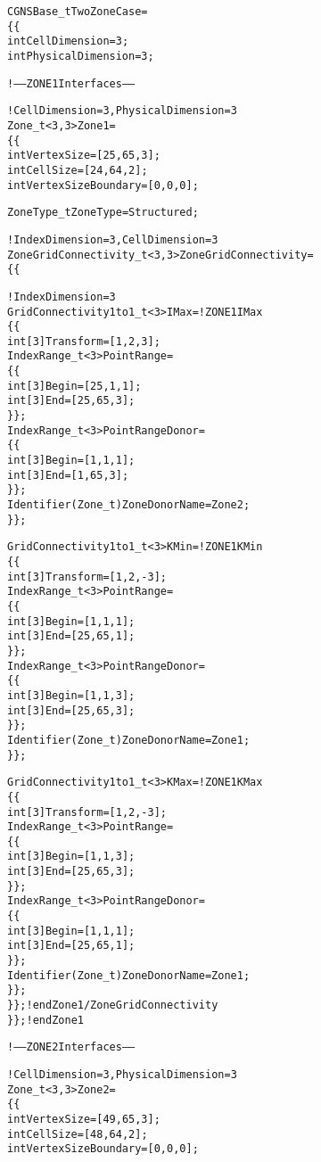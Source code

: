 \begin{alltt}
CGNSBase\_t TwoZoneCase =
  \{\{
  int CellDimension = 3 ;
  int PhysicalDimension = 3 ;


  !  -----  ZONE 1 Interfaces  ------

  !  CellDimension = 3, PhysicalDimension = 3
  Zone\_t<3,3> Zone1 =
    \{\{
    int VertexSize = [25,65,3] ;
    int CellSize   = [24,64,2] ;
    int VertexSizeBoundary = [0,0,0];

    ZoneType\_t ZoneType = Structured;

    !  IndexDimension = 3, CellDimension = 3
    ZoneGridConnectivity\_t<3,3> ZoneGridConnectivity =
      \{\{
 
      !  IndexDimension = 3
      GridConnectivity1to1\_t<3> IMax =                ! ZONE 1 IMax
        \{\{
        int[3] Transform = [1,2,3] ;
        IndexRange\_t<3> PointRange =
          \{\{
          int[3] Begin = [25,1 ,1] ;
          int[3] End   = [25,65,3] ;
          \}\} ;
        IndexRange\_t<3> PointRangeDonor =
          \{\{
          int[3] Begin = [1,1 ,1] ;
          int[3] End   = [1,65,3] ;
          \}\} ;
        Identifier(Zone\_t) ZoneDonorName = Zone2 ;
        \}\} ;

      GridConnectivity1to1\_t<3> KMin =                ! ZONE 1 KMin 
        \{\{
        int[3] Transform = [1,2,-3] ;
        IndexRange\_t<3> PointRange =
          \{\{
          int[3] Begin = [1 ,1 ,1] ;
          int[3] End   = [25,65,1] ;
          \}\} ;
        IndexRange\_t<3> PointRangeDonor =
          \{\{
          int[3] Begin = [1 ,1 ,3] ;
          int[3] End   = [25,65,3] ;
          \}\} ;
        Identifier(Zone\_t) ZoneDonorName = Zone1 ;
        \}\} ;

      GridConnectivity1to1\_t<3> KMax =                ! ZONE 1 KMax 
        \{\{
        int[3] Transform = [1,2,-3] ;
        IndexRange\_t<3> PointRange =
          \{\{
          int[3] Begin = [1 ,1 ,3] ;
          int[3] End   = [25,65,3] ;
          \}\} ;
        IndexRange\_t<3> PointRangeDonor =
          \{\{
          int[3] Begin = [1 ,1 ,1] ;
          int[3] End   = [25,65,1] ;
          \}\} ;
        Identifier(Zone\_t) ZoneDonorName = Zone1 ;
        \}\} ;
      \}\} ;      ! end Zone1/ZoneGridConnectivity
    \}\} ;        ! end Zone1


   !  -----  ZONE 2 Interfaces  ------

  !  CellDimension = 3, PhysicalDimension = 3
   Zone\_t<3,3> Zone2 =
    \{\{
    int VertexSize = [49,65,3] ;
    int CellSize   = [48,64,2] ;
    int VertexSizeBoundary = [0,0,0];


\end{alltt}
